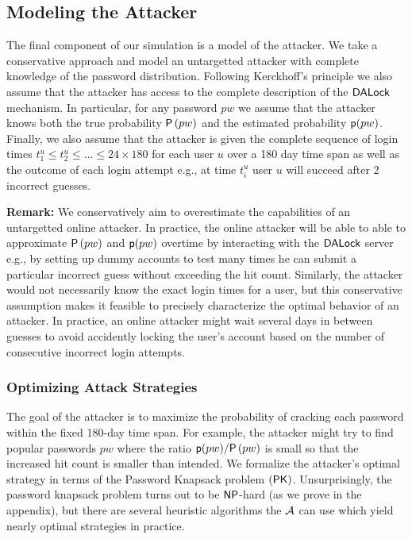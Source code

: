 \subsection{Modeling the Attacker}\label{section:ExperimentDesign-subsection:SimulateAttacker} %
The final component of our simulation is a model of the attacker. We take a conservative approach and model an untargetted attacker with complete knowledge of the password distribution. Following Kerckhoff's principle we also assume that the attacker has access to the complete description of the $\mathsf{DALock}$ mechanism. In particular, for any password $pw$ we assume that the attacker knows both the true probability $ \mathsf{P}\left(pw\right)$ and the estimated probability $\textsf{p}(pw)$.  Finally, we also assume that the attacker is given the complete sequence of login times $t_1^u \leq t_2^u \leq  \ldots \leq 24 \times 180$ for each user $u$ over a 180 day time span as well as the outcome of each login attempt e.g., at time $t_i^u$ user $u$ will succeed after 2 incorrect guesses. 

{\bf Remark:} We conservatively aim to overestimate the capabilities of an untargetted online attacker. In practice, the online attacker will be able to able to approximate $ \mathsf{P}\left(pw\right)$  and $\textsf{p}(pw)$ overtime by interacting with the $\mathsf{DALock}$ server e.g., by setting up dummy accounts to test many times he can submit a particular incorrect guess without exceeding the hit count. Similarly, the attacker would not necessarily know the exact login times for a user, but this conservative assumption makes it feasible to precisely characterize the optimal behavior of an attacker. In practice, an online attacker might wait several days in between guesses to avoid accidently locking the user's account based on the number of consecutive incorrect login attempts. 

\subsubsection{Optimizing Attack Strategies} %
The goal of the attacker is to maximize the probability of cracking each password within the fixed 180-day time span. For example, the attacker might try to find popular passwords $pw$ where the ratio $\textsf{p}(pw)/\mathsf{P}\left(pw\right)$ is small so that the increased hit count is smaller than intended. We formalize the attacker's optimal strategy in terms of the \textsf{Password Knapsack} problem $(\mathsf{PK})$. Unsurprisingly, the password knapsack problem turns out to be $\mathsf{NP}$-hard (as we prove in the appendix), but there are several heuristic algorithms the $\mathcal{A}$ can use which yield nearly optimal strategies in practice. 

